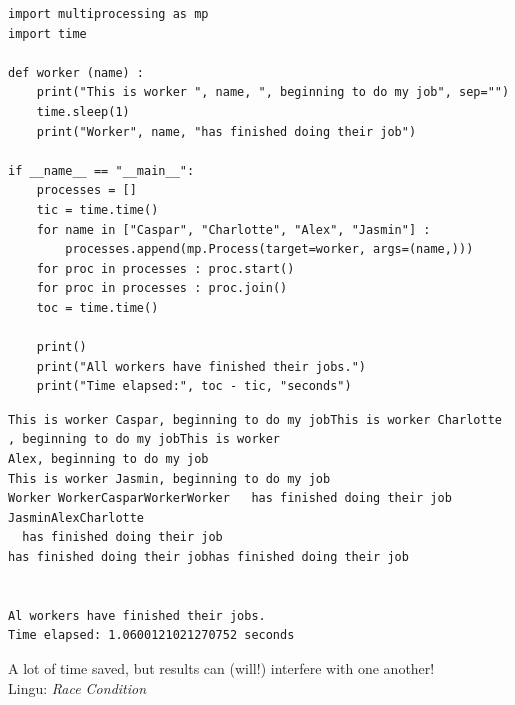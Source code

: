 \begin{frame}[fragile]
%
\begin{codebox}
\begin{verbatim}
import multiprocessing as mp
import time

def worker (name) :
    print("This is worker ", name, ", beginning to do my job", sep="")
    time.sleep(1)
    print("Worker", name, "has finished doing their job")

if __name__ == "__main__":
    processes = []
    tic = time.time()
    for name in ["Caspar", "Charlotte", "Alex", "Jasmin"] :
        processes.append(mp.Process(target=worker, args=(name,)))
    for proc in processes : proc.start()
    for proc in processes : proc.join()
    toc = time.time()
    
    print()
    print("All workers have finished their jobs.")
    print("Time elapsed:", toc - tic, "seconds")
\end{verbatim}
\end{codebox}
%
\end{frame}


\begin{frame}[fragile]
%
\begin{cmdbox}
\begin{verbatim}
This is worker Caspar, beginning to do my jobThis is worker Charlotte
, beginning to do my jobThis is worker 
Alex, beginning to do my job
This is worker Jasmin, beginning to do my job
Worker WorkerCasparWorkerWorker   has finished doing their job JasminAlexCharlotte
  has finished doing their job 
has finished doing their jobhas finished doing their job


Al workers have finished their jobs.
Time elapsed: 1.0600121021270752 seconds
\end{verbatim}
\end{cmdbox}

\begin{center}
\Thus A lot of time saved, but results can (will!) interfere with one another!\\
\Thus Lingu: \emph{Race Condition}
\end{center}
%
\end{frame}


